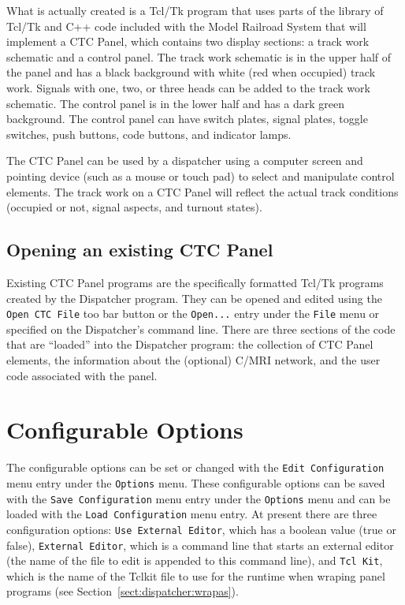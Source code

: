 What is actually created is a Tcl/Tk program that uses parts of the
library of Tcl/Tk and C++ code included with the Model Railroad System
that will implement a CTC Panel, which contains two display sections: a
track work schematic and a control panel.  The track work schematic is in
the upper half of the panel and has a black background with white (red
when occupied) track work. Signals with one, two, or three heads can be
added to the track work schematic.  The control panel is in the lower
half and has a dark green background. The control panel can have switch
plates, signal plates, toggle switches, push buttons, code buttons, and
indicator lamps.

The CTC Panel can be used by a dispatcher using a computer screen and
pointing device (such as a mouse or touch pad) to select and manipulate
control elements. The track work on a CTC Panel will reflect the actual
track conditions (occupied or not, signal aspects, and turnout states).

\subsection{Opening an existing CTC Panel}

Existing CTC Panel programs are the specifically formatted Tcl/Tk programs
created by the Dispatcher program.  They can be opened and edited using
the \verb=Open CTC File= too bar button or the \verb=Open...= entry under
the \verb=File= menu or specified on the Dispatcher's command line. 
There are three sections of the code that are ``loaded'' into the
Dispatcher program: the collection of CTC Panel elements, the
information about the (optional) C/MRI network, and the user code
associated with the panel.

\section{Configurable Options}
\label{sect:dispatcher:configopts}

The configurable options can be set or changed with the 
\verb=Edit Configuration= menu entry under the \verb=Options= menu. These
configurable options can be saved with the \verb=Save Configuration=
menu entry under the \verb=Options= menu and can be loaded with the 
\verb=Load Configuration= menu entry.  At present there are three
configuration options: \verb=Use External Editor=, which has a boolean
value (true or false), \verb=External Editor=, which is a
command line that starts an external editor (the name of the file
to edit is appended to this command line), and \verb=Tcl Kit=, which is
the name of the Tclkit file to use for the runtime when wraping panel
programs (see Section~\ref{sect:dispatcher:wrapas}).

